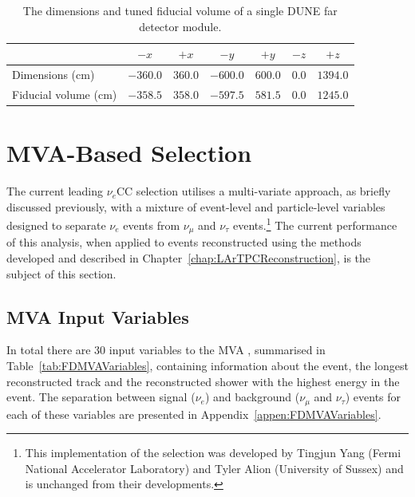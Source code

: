 \begin{table}
  \centering
  \caption[The dimensions and tuned fiducial volume of a single DUNE far detector module.]{The dimensions and tuned fiducial volume of a single DUNE far detector module.}
  \label{tab:FV}
  \begin{tabular}{ l c c c c c c }
    \toprule
     & $-x$ & $+x$ & $-y$ & $+y$ & $-z$ & $+z$ \\
    \midrule
    Dimensions (cm)      & $-360.0$ & $360.0$ & $-600.0$ & $600.0$ & $0.0$ & $1394.0$ \\
    Fiducial volume (cm) & $-358.5$ & $358.0$ & $-597.5$ & $581.5$ & $0.0$ & $1245.0$ \\
    \bottomrule
  \end{tabular}
\end{table}

\section{MVA-Based Selection}\label{sec:FDMVA}

The current leading $\nu_e$CC selection utilises a multi-variate approach, as briefly discussed previously, with a mixture of event-level and particle-level variables designed to separate $\nu_e$ events from $\nu_{\mu}$ and $\nu_{\tau}$ events.\footnote{This implementation of the selection was developed by Tingjun Yang (Fermi National Accelerator Laboratory) and Tyler Alion (University of Sussex) and is unchanged from their developments.}  The current performance of this analysis, when applied to events reconstructed using the methods developed and described in Chapter~\ref{chap:LArTPCReconstruction}, is the subject of this section.

\subsection{MVA Input Variables}\label{sec:FDMVAVariables}

In total there are 30 input variables to the MVA \cite{TMVA}, summarised in Table~\ref{tab:FDMVAVariables}, containing information about the event, the longest reconstructed track and the reconstructed shower with the highest energy in the event.  The separation between signal ($\nu_e$) and background ($\nu_{\mu}$ and $\nu_{\tau}$) events for each of these variables are presented in Appendix~\ref{appen:FDMVAVariables}.

